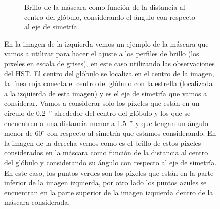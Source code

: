 \documentclass{book}
\begin{document}
\begin{figure}[htb]
\begin{subfigure}[b]{0.5\textwidth}
    \caption{Brillo de la máscara como función de la distancia al centro del glóbulo, considerando el ángulo con respecto al eje de simetría.}
    \label{fig:f2}
  \end{subfigure}
  \caption{En la imagen de la izquierda vemos un ejemplo de la máscara que vamos a utilizar para hacer el ajuste a los perfiles de brillo (los pixeles en escala de grises), en este caso utilizando las observaciones del HST. El centro del glóbulo se localiza en el centro de la imagen, la línea roja conecta el centro del glóbulo con la estrella (localizada a la izquierda de esta imagen) y es el eje de simetría que vamos a considerar. Vamos a considerar solo los píxeles que están en un círculo de \SI{0.2}{\arcsecond} alrededor del centro del glóbulo y los que se encuentren a una distancia menor a \SI{1.5}{\arcsecond} y que tengan un ángulo menor de $60^\circ$ con respecto al simetría que estamos considerando. En la imagen de la derecha vemos como es el brillo de estos píxeles considerados en la máscara como función de la distancia al centro del glóbulo y considerando su ángulo con respecto al eje de simetría. En este caso, los puntos verdes son los píxeles que están en la parte inferior de la imagen izquierda, por otro lado los puntos azules se encuentran en la parte superior de la imagen izquierda dentro de la máscara considerada.}
  \label{ejemplo mascara}
\end{figure}
\end{document}
